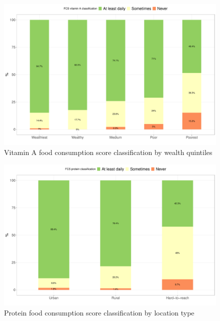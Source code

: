 \documentclass[12pt,a4paper]{article}
\begin{document}
\begin{figure}[H]

{\centering \includegraphics{kayinReport_files/figure-latex/fcsn2plot-1} 

}

\caption{Vitamin A food consumption score classification by wealth quintiles}\label{fig:fcsn2plot}
\end{figure}

\begin{figure}[H]

{\centering \includegraphics{kayinReport_files/figure-latex/fcsn3plot-1} 

}

\caption{Protein food consumption score classification by location type}\label{fig:fcsn3plot}
\end{figure}
\end{document}
